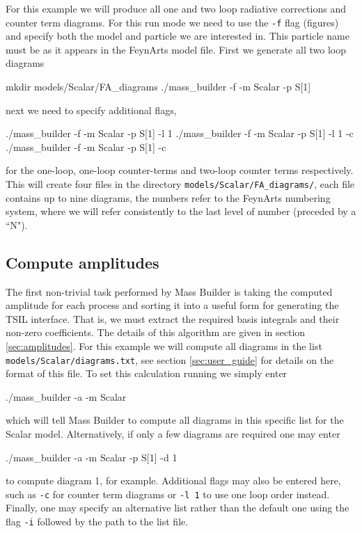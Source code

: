 For this example we will produce all one and two loop radiative corrections and counter term diagrams.  For this run mode we need to use the \lstinline{-f} flag (figures) and specify both the model and particle we are interested in.  This particle name must be as it appears in the FeynArts model file.  First we generate all two loop diagrams
\begin{lstterm}
mkdir models/Scalar/FA_diagrams
./mass_builder -f -m Scalar -p S[1]
\end{lstterm}
next we need to specify additional flags,
\begin{lstterm}
./mass_builder -f -m Scalar -p S[1] -l 1
./mass_builder -f -m Scalar -p S[1] -l 1 -c
./mass_builder -f -m Scalar -p S[1]  -c
\end{lstterm}
for the one-loop, one-loop counter-terms and two-loop counter terms respectively.  This will create four files in the directory \lstinline{models/Scalar/FA_diagrams/}, each file contains up to nine diagrams, the numbers refer to the FeynArts numbering system, where we will refer consistently to the last level of number (preceded by a ``N").

\subsection{Compute amplitudes}

The first non-trivial task performed by Mass Builder is taking the computed amplitude for each process and sorting it into a useful form for generating the TSIL interface.  That is, we must extract the required basis integrals and their non-zero coefficients.  The details of this algorithm are given in section \ref{sec:amplitudes}.  For this example we will compute all diagrams in the list \lstinline{models/Scalar/diagrams.txt}, see section \ref{sec:user_guide} for details on the format of this file.  To set this calculation running we simply enter
\begin{lstterm}
./mass_builder -a -m Scalar
\end{lstterm}
which will tell Mass Builder to compute all diagrams in this specific list for the Scalar model.  Alternatively, if only a few diagrams are required one may enter
\begin{lstterm}
./mass_builder -a -m Scalar -p S[1] -d 1
\end{lstterm}
to compute diagram 1, for example.  Additional flags may also be entered here, such as \lstinline{-c} for counter term diagrams or \lstinline{-l 1} to use one loop order instead.  Finally, one may specify an alternative list rather than the default one using the flag \lstinline{-i} followed by the path to the list file.


